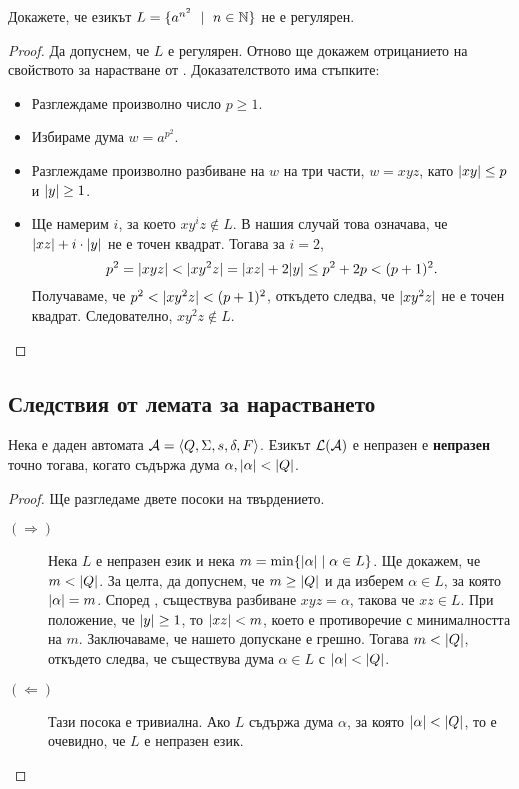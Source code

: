 \begin{problem}
  Докажете, че езикът $L = \{a^{n^2}\ \mid\ n\in\Nat\}$ не е регулярен.  
\end{problem}
\begin{proof}
  Да допуснем, че $L$ е регулярен. Отново ще докажем отрицанието на свойството за нарастване от .
  Доказателството има стъпките:
  \begin{itemize}
  \item 
    Разглеждаме произволно число $p \geq 1$.
  \item
    Избираме дума $w = a^{p^2}$.
  \item
    Разглеждаме произволно разбиване на $w$ на три части, $w = xyz$, 
    като $\lvert{xy}\rvert \leq p$ и $\lvert{y}\rvert \geq 1$.
  \item
    Ще намерим $i$, за което $xy^iz \not\in L$.
    В нашия случай това означава, че $\lvert{xz}\rvert + i\cdot\lvert{y}\rvert$ не е точен квадрат.
    Тогава за $i = 2$,
    \[p^2 = \lvert{xyz}\rvert < \lvert{xy^2z}\rvert = \lvert{xz}\rvert + 2\lvert{y}\rvert \leq p^2 + 2p < (p+1)^2 .\]
    Получаваме, че $p^2 < \lvert{xy^2z}\rvert < (p+1)^2$,
    откъдето следва, че $\lvert{xy^2z}\rvert$ не е точен квадрат.
    Следователно, $xy^2z \not\in L$.
  \end{itemize}
\end{proof}

\subsection{Следствия от лемата за нарастването}

\begin{prop}
  Нека е даден автомата $\mathcal{A} = \langle{Q,\Sigma,s,\delta,F}\rangle$.
  Езикът $\mathcal{L}(\mathcal{A})$ е непразен е {\bf непразен} точно тогава, когато съдържа дума $\alpha, \lvert{\alpha}\rvert < \lvert{Q}\rvert$.
\end{prop}
\begin{proof}
  Ще разгледаме двете посоки на твърдението.
  \begin{description}
  \item[$(\Rightarrow)$]
    Нека $L$ е непразен език и нека $m = \min\{\lvert{\alpha}\rvert \mid \alpha \in L\}$.
    Ще докажем, че $m < \lvert{Q}\rvert$.    
    За целта, да допуснем, че $m \geq \lvert{Q}\rvert$ и да изберем $\alpha \in L$, за която $\lvert{\alpha}\rvert = m$.
    Според , съществува разбиване $xyz = \alpha$, 
    такова че $xz \in L$.
    При положение, че $\lvert{y}\rvert \geq 1$, то $\lvert{xz}\rvert < m$, което 
    е противоречие с минималността на $m$.
    Заключаваме, че нашето допускане е грешно. Тогава $m < \lvert{Q}\rvert$, откъдето следва, че 
    съществува дума $\alpha \in L$ с $\lvert{\alpha}\rvert < \lvert{Q}\rvert$.
  \item[$(\Leftarrow)$]
    Тази посока е тривиална.
    Ако $L$ съдържа дума $\alpha$, за която $\lvert{\alpha}\rvert < \lvert{Q}\rvert$,
    то е очевидно, че $L$ е непразен език.
  \end{description}
\end{proof}

